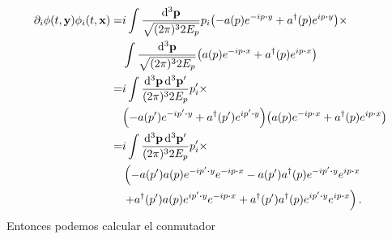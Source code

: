 \documentclass{article}
\begin{document}
\begin{align}
\begin{split}
\partial_i\phi(t,\vb{y})\phi_i(t,\vb{x})=&i\int \frac{\dd[3]{\vb{p}}}{\sqrt{(2\pi)^32E_p}}p_i\qty(-a(p)e^{-ip\vdot y}+a^\dagger(p)e^{ip\vdot y})\times\\
&\int \frac{\dd[3]{\vb{p}}}{\sqrt{(2\pi)^32E_p}}\qty(a(p)e^{-ip\vdot x}+a^\dagger(p)e^{ip\vdot x})\\
=&i\int\frac{\dd[3]{\vb{p}}\dd[3]{\vb{p'}}}{(2\pi)^32E_p}p_i'\times\\
&\qty(-a(p')e^{-ip'\vdot y}+a^\dagger(p')e^{ip'\vdot y})\qty(a(p)e^{-ip\vdot x}+a^\dagger(p)e^{ip\vdot x})
\\
=&i\int\frac{\dd[3]{\vb{p}}\dd[3]{\vb{p'}}}{(2\pi)^32E_p}p_i'\times\\
&\left(-a(p')a(p)e^{-ip'\vdot y}e^{-ip\vdot x}-a(p')a^\dagger(p)e^{-ip'\vdot y}e^{ip\vdot x}\right.\\
&\left.+a^\dagger(p')a(p)e^{ip'\vdot y}e^{-ip\vdot x}+a^\dagger(p')a^\dagger(p)e^{ip'\vdot y}e^{ip\vdot x}\right).
\end{split}
\end{align}
Entonces podemos calcular el conmutador
\end{document}

